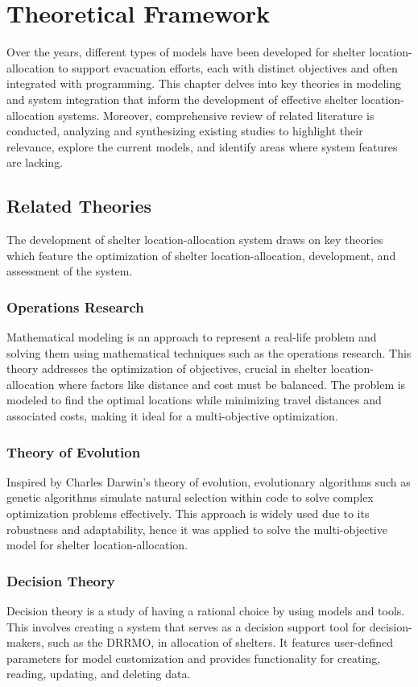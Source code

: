 \chapter{Theoretical Framework}
	Over the years, different types of models have been developed for shelter location-allocation to support evacuation efforts, each with distinct objectives and often integrated with programming. This chapter delves into key theories in modeling and system integration that inform the development of effective shelter location-allocation systems. Moreover, comprehensive review of related literature is conducted, analyzing and synthesizing existing studies to highlight their relevance, explore the current models, and identify areas where system features are lacking. 

\section{Related Theories}
	The development of shelter location-allocation system draws on key theories which feature the optimization of shelter location-allocation, development, and assessment of the system.

\subsection{Operations Research}
 	Mathematical modeling is an approach to represent a real-life problem and solving them using mathematical techniques such as the operations research. This theory addresses the optimization of objectives, crucial in shelter location-allocation where factors like distance and cost must be balanced. The problem is modeled to find the optimal locations while minimizing travel distances and associated costs, making it ideal for a multi-objective optimization.

\subsection{Theory of Evolution}
	Inspired by Charles Darwin’s theory of evolution, evolutionary algorithms such as genetic algorithms simulate natural selection within code to solve complex optimization problems effectively. This approach is widely used due to its robustness and adaptability, hence it was applied to solve the multi-objective model for shelter location-allocation.

\subsection{Decision Theory}
 	Decision theory is a study of having a rational choice by using models and tools. This involves creating a system that serves as a decision support tool for decision-makers, such as the DRRMO, in allocation of shelters. It features user-defined parameters for model customization and provides functionality for creating, reading, updating, and deleting data.
 	
